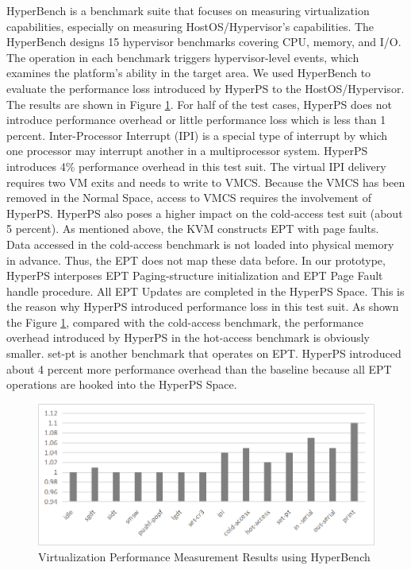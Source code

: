 HyperBench is a benchmark suite that focuses on measuring virtualization capabilities, especially on measuring HostOS/Hypervisor's capabilities. 
The HyperBench designs 15 hypervisor benchmarks covering CPU, memory, and I/O. The operation in each benchmark triggers hypervisor-level events, which examines the platform's ability in the target area. We used HyperBench to evaluate the performance loss introduced by HyperPS to the HostOS/Hypervisor.
The results are shown in Figure \ref{fig:hyperbench}. For half of the test cases, HyperPS does not introduce performance overhead or little performance loss which is less than 1 percent. 
Inter-Processor Interrupt (IPI) is a special type of interrupt by which one processor may interrupt another in a multiprocessor system. 
HyperPS introduces 4\% performance overhead in this test suit. 
The virtual IPI delivery requires two VM exits and needs to write to VMCS. Because the VMCS has been removed in the Normal Space, access to VMCS requires the involvement of HyperPS.  
HyperPS also poses a higher impact on the cold-access test suit (about 5 percent). 
As mentioned above, the KVM constructs EPT with page faults. Data accessed in the cold-access benchmark is not loaded into physical memory in advance. Thus, the EPT does not map these data before. In our prototype, HyperPS interposes EPT Paging-structure initialization and EPT Page Fault handle procedure. 
All EPT Updates are completed in the HyperPS Space. This is the reason why HyperPS introduced performance loss in this test suit. 
As shown the Figure \ref{fig:hyperbench}, compared with the cold-access benchmark, the performance overhead introduced by HyperPS in the hot-access benchmark is obviously smaller. 
set-pt is another benchmark that operates on EPT. HyperPS introduced about 4 percent more performance overhead than the baseline because all EPT operations are hooked into the HyperPS Space. 

\begin{figure}[htpb]
    \centering
    \includegraphics[width=0.9\linewidth]{./IMG/hyperbench.png}
    \caption{Virtualization Performance Measurement Results using HyperBench}
    \label{fig:hyperbench}
\end{figure}



